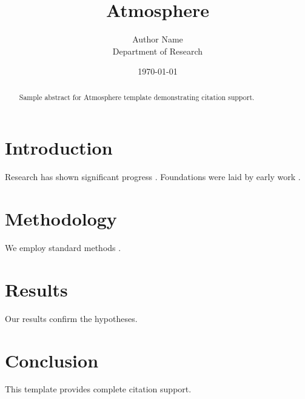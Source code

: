 \documentclass{mdpi}
\title{Atmosphere}
\author{Author Name \\ \small Department of Research}
\date{\today}
\begin{document}
\maketitle

\begin{abstract}
Sample abstract for Atmosphere template demonstrating citation support.
\end{abstract}

\section{Introduction}
Research has shown significant progress \citep{einstein1905}. Foundations were laid by early work \citep{turing1950}.

\section{Methodology}
We employ standard methods \citep{knuth1984}.

\section{Results}
Our results confirm the hypotheses.

\section{Conclusion}
This template provides complete citation support.



\end{document}
